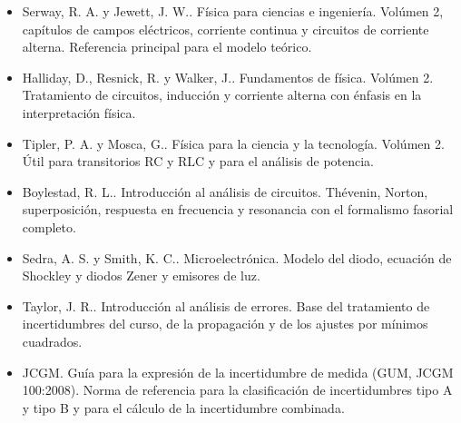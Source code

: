 \documentclass[11pt,a4paper]{article}
\begin{document}
\begin{itemize}[leftmargin=1.4em,itemsep=2pt,topsep=3pt]
  \item Serway, R. A. y Jewett, J. W.. Física para ciencias e ingeniería. Volúmen 2, capítulos de campos eléctricos, corriente continua y circuitos de corriente alterna. Referencia principal para el modelo teórico.
  \item Halliday, D., Resnick, R. y Walker, J.. Fundamentos de física. Volúmen 2. Tratamiento de circuitos, inducción y corriente alterna con énfasis en la interpretación física.
  \item Tipler, P. A. y Mosca, G.. Física para la ciencia y la tecnología. Volúmen 2. Útil para transitorios RC y RLC y para el análisis de potencia.
  \item Boylestad, R. L.. Introducción al análisis de circuitos. Thévenin, Norton, superposición, respuesta en frecuencia y resonancia con el formalismo fasorial completo.
  \item Sedra, A. S. y Smith, K. C.. Microelectrónica. Modelo del diodo, ecuación de Shockley y diodos Zener y emisores de luz.
  \item Taylor, J. R.. Introducción al análisis de errores. Base del tratamiento de incertidumbres del curso, de la propagación y de los ajustes por mínimos cuadrados.
  \item JCGM. Guía para la expresión de la incertidumbre de medida (GUM, JCGM 100:2008). Norma de referencia para la clasificación de incertidumbres tipo A y tipo B y para el cálculo de la incertidumbre combinada.
\end{itemize}
\end{document}
